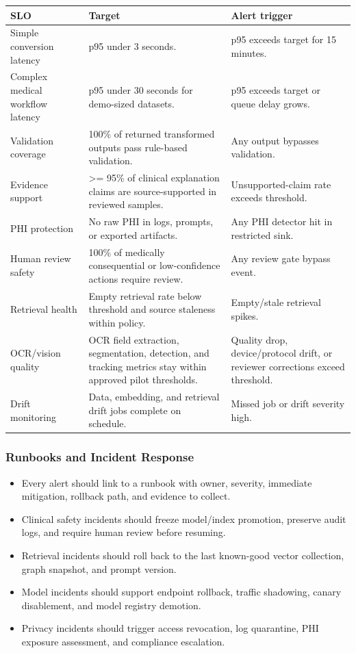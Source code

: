 \begin{tabularx}{\textwidth}{p{}X p{}}
\toprule
\textbf{SLO} & \textbf{Target} & \textbf{Alert trigger} \\
\midrule
Simple conversion latency & p95 under 3 seconds. & p95 exceeds target for 15 minutes. \\
Complex medical workflow latency & p95 under 30 seconds for demo-sized datasets. & p95 exceeds target or queue delay grows. \\
Validation coverage & 100\% of returned transformed outputs pass rule-based validation. & Any output bypasses validation. \\
Evidence support & >= 95\% of clinical explanation claims are source-supported in reviewed samples. & Unsupported-claim rate exceeds threshold. \\
PHI protection & No raw PHI in logs, prompts, or exported artifacts. & Any PHI detector hit in restricted sink. \\
Human review safety & 100\% of medically consequential or low-confidence actions require review. & Any review gate bypass event. \\
Retrieval health & Empty retrieval rate below threshold and source staleness within policy. & Empty/stale retrieval spikes. \\
OCR/vision quality & OCR field extraction, segmentation, detection, and tracking metrics stay within approved pilot thresholds. & Quality drop, device/protocol drift, or reviewer corrections exceed threshold. \\
Drift monitoring & Data, embedding, and retrieval drift jobs complete on schedule. & Missed job or drift severity high. \\
\bottomrule
\end{tabularx}

\subsubsection{Runbooks and Incident Response}

\begin{itemize}
  \item Every alert should link to a runbook with owner, severity, immediate mitigation, rollback path, and evidence to collect.
  \item Clinical safety incidents should freeze model/index promotion, preserve audit logs, and require human review before resuming.
  \item Retrieval incidents should roll back to the last known-good vector collection, graph snapshot, and prompt version.
  \item Model incidents should support endpoint rollback, traffic shadowing, canary disablement, and model registry demotion.
  \item Privacy incidents should trigger access revocation, log quarantine, PHI exposure assessment, and compliance escalation.
\end{itemize}

